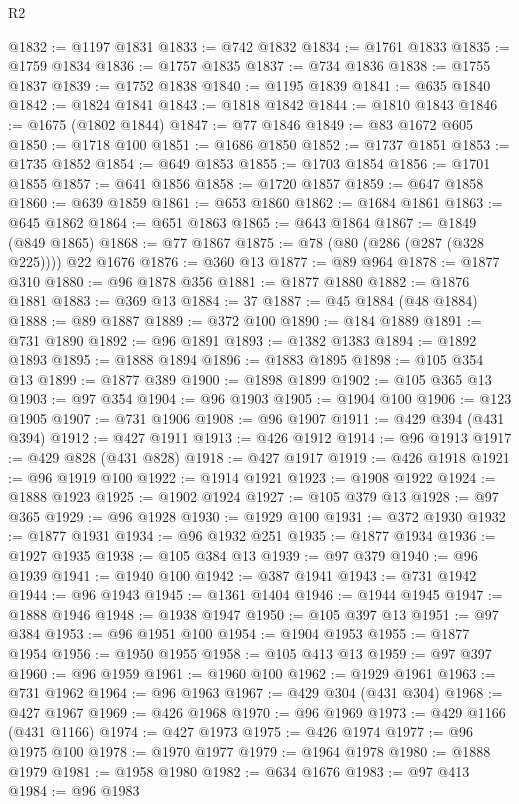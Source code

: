 \begin{lexlean}{R2}
\begin{coremodule}
@1832 := @1197 @1831
@1833 := @742 @1832
@1834 := @1761 @1833
@1835 := @1759 @1834
@1836 := @1757 @1835
@1837 := @734 @1836
@1838 := @1755 @1837
@1839 := @1752 @1838
@1840 := @1195 @1839
@1841 := @635 @1840
@1842 := @1824 @1841
@1843 := @1818 @1842
@1844 := @1810 @1843
@1846 := @1675 (@1802 @1844)
@1847 := @77 @1846
@1849 := @83 @1672 @605
@1850 := @1718 @100
@1851 := @1686 @1850
@1852 := @1737 @1851
@1853 := @1735 @1852
@1854 := @649 @1853
@1855 := @1703 @1854
@1856 := @1701 @1855
@1857 := @641 @1856
@1858 := @1720 @1857
@1859 := @647 @1858
@1860 := @639 @1859
@1861 := @653 @1860
@1862 := @1684 @1861
@1863 := @645 @1862
@1864 := @651 @1863
@1865 := @643 @1864
@1867 := @1849 (@849 @1865)
@1868 := @77 @1867
@1875 := @78 (@80 (@286 (@287 (@328 @225)))) @22 @1676
@1876 := @360 @13
@1877 := @89 @964
@1878 := @1877 @310
@1880 := @96 @1878 @356
@1881 := @1877 @1880
@1882 := @1876 @1881
@1883 := @369 @13
@1884 := 37
@1887 := @45 @1884 (@48 @1884)
@1888 := @89 @1887
@1889 := @372 @100
@1890 := @184 @1889
@1891 := @731 @1890
@1892 := @96 @1891
@1893 := @1382 @1383
@1894 := @1892 @1893
@1895 := @1888 @1894
@1896 := @1883 @1895
@1898 := @105 @354 @13
@1899 := @1877 @389
@1900 := @1898 @1899
@1902 := @105 @365 @13
@1903 := @97 @354
@1904 := @96 @1903
@1905 := @1904 @100
@1906 := @123 @1905
@1907 := @731 @1906
@1908 := @96 @1907
@1911 := @429 @394 (@431 @394)
@1912 := @427 @1911
@1913 := @426 @1912
@1914 := @96 @1913
@1917 := @429 @828 (@431 @828)
@1918 := @427 @1917
@1919 := @426 @1918
@1921 := @96 @1919 @100
@1922 := @1914 @1921
@1923 := @1908 @1922
@1924 := @1888 @1923
@1925 := @1902 @1924
@1927 := @105 @379 @13
@1928 := @97 @365
@1929 := @96 @1928
@1930 := @1929 @100
@1931 := @372 @1930
@1932 := @1877 @1931
@1934 := @96 @1932 @251
@1935 := @1877 @1934
@1936 := @1927 @1935
@1938 := @105 @384 @13
@1939 := @97 @379
@1940 := @96 @1939
@1941 := @1940 @100
@1942 := @387 @1941
@1943 := @731 @1942
@1944 := @96 @1943
@1945 := @1361 @1404
@1946 := @1944 @1945
@1947 := @1888 @1946
@1948 := @1938 @1947
@1950 := @105 @397 @13
@1951 := @97 @384
@1953 := @96 @1951 @100
@1954 := @1904 @1953
@1955 := @1877 @1954
@1956 := @1950 @1955
@1958 := @105 @413 @13
@1959 := @97 @397
@1960 := @96 @1959
@1961 := @1960 @100
@1962 := @1929 @1961
@1963 := @731 @1962
@1964 := @96 @1963
@1967 := @429 @304 (@431 @304)
@1968 := @427 @1967
@1969 := @426 @1968
@1970 := @96 @1969
@1973 := @429 @1166 (@431 @1166)
@1974 := @427 @1973
@1975 := @426 @1974
@1977 := @96 @1975 @100
@1978 := @1970 @1977
@1979 := @1964 @1978
@1980 := @1888 @1979
@1981 := @1958 @1980
@1982 := @634 @1676
@1983 := @97 @413
@1984 := @96 @1983

\end{coremodule}
\end{lexlean}
